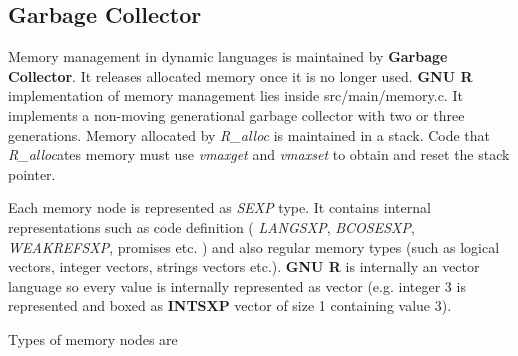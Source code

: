 \documentclass[thesis=M,english]{FITthesis}[2018/10/20]
\begin{document}
\subsection{Garbage Collector}\label{GC}

Memory management in dynamic languages is maintained by  \textbf{Garbage Collector}. It releases allocated memory once it is no longer used. \textbf{GNU R} implementation of memory management lies inside src/main/memory.c. It implements a non-moving generational garbage collector with two or three generations. Memory allocated by \textit{R{\_}alloc} is maintained in a stack. Code that \textit{R{\_}alloc}ates memory must use \textit{vmaxget} and \textit{vmaxset} to obtain and reset the stack pointer.

Each memory node is represented as \textit{SEXP} type. It contains internal representations such as code definition ( \textit{LANGSXP}, \textit{BCOSESXP}, \textit{WEAKREFSXP}, promises etc. ) and also regular memory types (such as logical vectors, integer vectors, strings vectors etc.). \textbf{GNU R} is internally an vector language so every value is internally represented as vector (e.g. integer 3 is represented and boxed as \textbf{INTSXP} vector of size 1 containing value 3).

Types of memory nodes are
\end{document}

